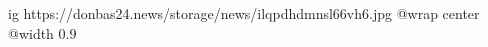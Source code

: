  
 
 
 
 

\ifcmt
  ig https://donbas24.news/storage/news/ilqpdhdmnsl66vh6.jpg
  @wrap center
  @width 0.9
\fi
